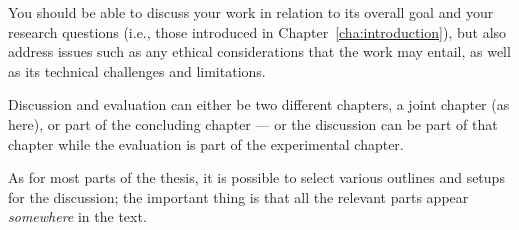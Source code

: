 You should be able to discuss your work in relation to its overall goal and your research questions (i.e., those introduced in Chapter~\ref{cha:introduction}),
but also address issues such as any ethical considerations that the work may entail,
as well as its technical challenges and limitations.

Discussion and evaluation can either be two different chapters, a joint chapter (as here), or part of the concluding chapter
--- or the discussion can be part of that chapter while the evaluation is part of the experimental chapter.

As for most parts of the thesis, it is possible to select various outlines and setups for the discussion; the important thing is that all the relevant parts appear \textit{somewhere\/} in the text.